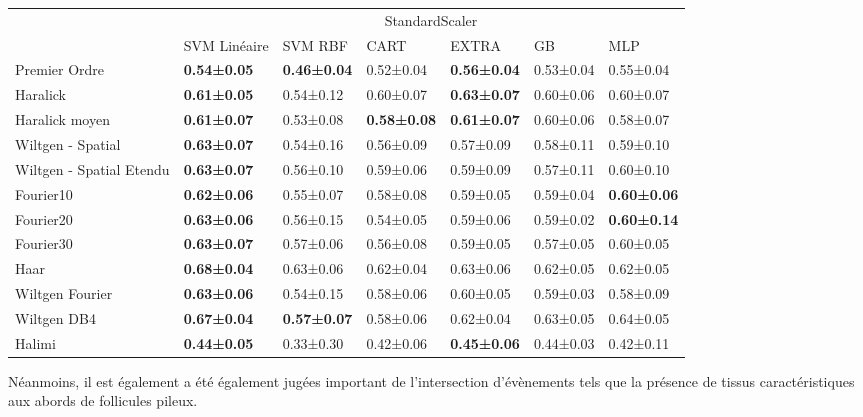 \begin{table}[]
\begin{tabular}{lllllll}
                         & \multicolumn{6}{c}{StandardScaler}                                                                                 \\
                         & SVM Linéaire       & SVM RBF            & CART               & EXTRA              & GB        & MLP                \\
Premier Ordre            & \textbf{0.54±0.05} & \textbf{0.46±0.04} & 0.52±0.04          & \textbf{0.56±0.04} & 0.53±0.04 & 0.55±0.04          \\
Haralick                 & \textbf{0.61±0.05} & 0.54±0.12          & 0.60±0.07          & \textbf{0.63±0.07} & 0.60±0.06 & 0.60±0.07          \\
Haralick moyen           & \textbf{0.61±0.07} & 0.53±0.08          & \textbf{0.58±0.08} & \textbf{0.61±0.07} & 0.60±0.06 & 0.58±0.07          \\
Wiltgen - Spatial        & \textbf{0.63±0.07} & 0.54±0.16          & 0.56±0.09          & 0.57±0.09          & 0.58±0.11 & 0.59±0.10          \\
Wiltgen - Spatial Etendu & \textbf{0.63±0.07} & 0.56±0.10          & 0.59±0.06          & 0.59±0.09          & 0.57±0.11 & 0.60±0.10          \\
Fourier10                & \textbf{0.62±0.06} & 0.55±0.07          & 0.58±0.08          & 0.59±0.05          & 0.59±0.04 & \textbf{0.60±0.06} \\
Fourier20                & \textbf{0.63±0.06} & 0.56±0.15          & 0.54±0.05          & 0.59±0.06          & 0.59±0.02 & \textbf{0.60±0.14} \\
Fourier30                & \textbf{0.63±0.07} & 0.57±0.06          & 0.56±0.08          & 0.59±0.05          & 0.57±0.05 & 0.60±0.05          \\
Haar                     & \textbf{0.68±0.04} & 0.63±0.06          & 0.62±0.04          & 0.63±0.06          & 0.62±0.05 & 0.62±0.05          \\
Wiltgen Fourier          & \textbf{0.63±0.06} & 0.54±0.15          & 0.58±0.06          & 0.60±0.05          & 0.59±0.03 & 0.58±0.09          \\
Wiltgen DB4              & \textbf{0.67±0.04} & \textbf{0.57±0.07} & 0.58±0.06          & 0.62±0.04          & 0.63±0.05 & 0.64±0.05          \\
Halimi                   & \textbf{0.44±0.05} & 0.33±0.30          & 0.42±0.06          & \textbf{0.45±0.06} & 0.44±0.03 & 0.42±0.11         
\end{tabular}
\end{table}

Néanmoins, il est également a été également jugées important de l'intersection d'évènements tels que la présence de tissus caractéristiques aux abords de follicules pileux.\par
